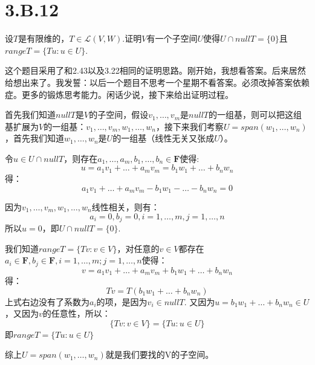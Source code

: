 \documentclass[10pt,a4paper,UTF8]{article}
\begin{document}
\section{3.B.12}
\label{sec:org6449440}


\begin{problem}
设\(T\)是有限维的，\(T\in \mathcal{L}(V,W)\).证明\(V\)有一个子空间\(U\)使得\(U\cap nullT = \{0\}\)且\(range T = \{Tu:u\in U\}\).
\end{problem}

\begin{answer}
这个题目采用了和2.43以及3.22相同的证明思路。刚开始，我想看答案。后来居然给想出来了。我发誓：以后一个题目不思考一个星期不看答案。必须改掉答案依赖症。更多的锻炼思考能力。闲话少说，接下来给出证明过程。

首先我们知道\(nullT\)是\(V\)的子空间，假设\(v_{1},\ldots ,v_{m}\)是\(nullT\)的一组基，则可以把这组基扩展为\(V\)的一组基：\(v_{1},\ldots ,v_{m},w_{1},\ldots ,w_{n}\)，接下来我们考察\(U = span(w_{1},\ldots ,w_{n})\)，首先我们知道\(w_{1},\ldots ,w_{n}\)是\(U\)的一组基（线性无关又张成\(U\)）。

令\(u\in U\cap nullT\)，则存在\(a_{1},\ldots ,a_{m}, b_{1},\ldots ,b_{n}\in \mathbf{F}\)使得:
\begin{equation}
\label{eq:6}
u = a_{1}v_{1} + \ldots + a_{m}v_{m} = b_{1}w_{1} + \ldots + b_{n}w_{n}
\end{equation}
得：
\begin{equation}
\label{eq:7}
a_{1}v_{1} + \ldots + a_{m}v_{m} - b_{1}w_{1} - \ldots - b_{n}w_{n} = 0
\end{equation}

因为\(v_{1},\ldots ,v_{m},w_{1},\ldots ,w_{n}\)线性相关，则有：
\[a_{i}=0,b_{j}=0,i=1,\ldots ,m,j= 1,\ldots ,n\]
所以\(u=0\)，即\(U\cap nullT = \{0\}\).

我们知道\(range T = \{Tv:v\in V\}\)，对任意的\(v\in V\)都存在\(a_{i}\in \mathbf{F},b_{j}\in \mathbf{F},i = 1,\ldots ,m;j=1,\ldots ,n\)使得：
\begin{equation}
\label{eq:8}
v = a_{1}v_{1} + \ldots + a_{m}v_{m} + b_{1}w_{1} + \ldots + b_{n}w_{n}
\end{equation}
得：
\begin{equation}
\label{eq:9}
Tv = T(b_{1}w_{1} + \ldots + b_{n}w_{n})
\end{equation}
上式右边没有了系数为\(a_{i}\)的项，是因为\(v_{i}\in nullT\). 又因为\(u=b_{1}w_{1}+ \ldots + b_{n}w_{n} \in U\)，又因为\(v\)的任意性，所以：
\begin{equation}
\label{eq:10}
\{Tv:v\in V\} = \{Tu:u\in U\}
\end{equation}
即\(rangeT = \{Tu:u\in U\}\)

综上\(U = span(w_{1},\ldots ,w_{n})\)就是我们要找的V的子空间。
\end{answer}
\end{document}
